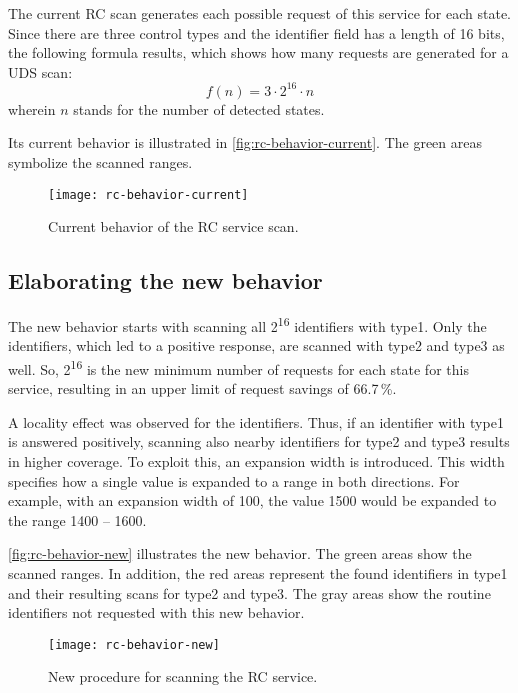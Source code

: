 The current RC scan generates each possible request of this service for each state. Since there are three control types and the identifier field has a length of 16 bits, the following formula results, which shows how many requests are generated for a UDS scan:
\[f(n)=3 \cdot 2^{16} \cdot n\]
wherein $n$ stands for the number of detected states.

Its current behavior is illustrated in \autoref{fig:rc-behavior-current}. The green areas symbolize the scanned ranges.

\begin{figure}[htb]
    \centering
    \texttt{[image: rc-behavior-current]}
    \caption{Current behavior of the RC service scan.}
    \label{fig:rc-behavior-current}
\end{figure}

\subsection{Elaborating the new behavior}
\label{subsubsec:rc-elaborating}

The new behavior starts with scanning all 2\textsuperscript{16} identifiers with type1. Only the identifiers, which led to a positive response, are scanned with type2 and type3 as well. So, 2\textsuperscript{16} is the new minimum number of requests for each state for this service, resulting in an upper limit of request savings of 66.7\,\%.

A locality effect was observed for the identifiers. Thus, if an identifier with type1 is answered positively, scanning also nearby identifiers for type2 and type3 results in higher coverage. To exploit this, an expansion width is introduced. This width specifies how a single value is expanded to a range in both directions. For example, with an expansion width of 100, the value 1500 would be expanded to the range 1400 – 1600.

\autoref{fig:rc-behavior-new} illustrates the new behavior. The green areas show the scanned ranges. In addition, the red areas represent the found identifiers in type1 and their resulting scans for type2 and type3. The gray areas show the routine identifiers not requested with this new behavior.

\begin{figure}[htb]
    \centering
    \texttt{[image: rc-behavior-new]}
    \caption{New procedure for scanning the RC service.}
    \label{fig:rc-behavior-new}
\end{figure}

